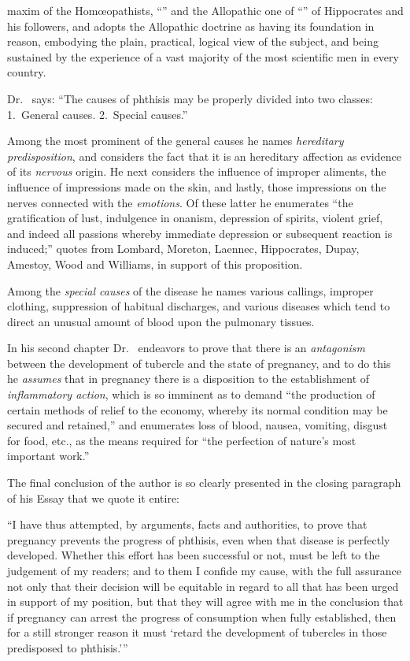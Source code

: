 maxim of the Homœopathists, ``'' and the
Allopathic one of ``'' of Hippocrates
and his followers, and adopts the Allopathic doctrine as having its
foundation in reason, embodying the plain, practical, logical view of
the subject, and being sustained by the experience of a vast majority of
the most scientific men in every country.

Dr.~ says: ``The causes of phthisis may be properly divided
into two classes:   1.~General causes. 2.~Special causes.''

Among the most prominent of the general causes he names \emph{hereditary
predisposition}, and considers the fact that it is an hereditary
affection as  evidence of its \emph{nervous} origin. He next considers
the influence of improper aliments, the influence of impressions
made on the skin, and lastly, those impressions on the nerves connected
with the \emph{emotions}. Of these latter he enumerates ``the gratification
of lust, indulgence in onanism, depression of spirits, violent grief, and
indeed all passions whereby immediate depression or subsequent reaction
is induced;'' quotes from Lombard, Moreton, Laennec, Hippocrates,
Dupay, Amestoy, Wood and Williams, in support of this proposition.

Among the \emph{special causes} of the disease he names various callings,
improper clothing, suppression of habitual discharges, and various diseases
which tend to direct an unusual amount of blood upon the pulmonary tissues.

In his second chapter Dr.~ endeavors to prove that there is
an \emph{antagonism} between the development of tubercle and the state of
pregnancy, and to do this he \emph{assumes} that in pregnancy there is a disposition
to the establishment of \emph{inflammatory action}, which is so imminent
as to demand ``the production of certain methods of relief to the
economy, whereby its normal condition may be secured and retained,''
and enumerates loss of blood, nausea, vomiting, disgust for food, etc., as
the means required for ``the perfection of nature's most important work.''

The final conclusion of the author is so clearly presented in the closing
paragraph of his Essay that we quote it entire:

``I have thus attempted, by arguments, facts and authorities, to
prove that pregnancy prevents the progress of phthisis, even when that
disease is perfectly developed. Whether this effort has been successful
or not, must be left to the judgement of my readers; and to them I
confide my cause, with the full assurance not only that their decision
will be equitable in regard to all that has been urged in support of my
position, but that they will agree with me in the conclusion that if
pregnancy can arrest the progress of consumption when fully established,
then for a still stronger reason it must `retard the development of
tubercles in those predisposed to phthisis.'\thinspace{}'' \endinput
